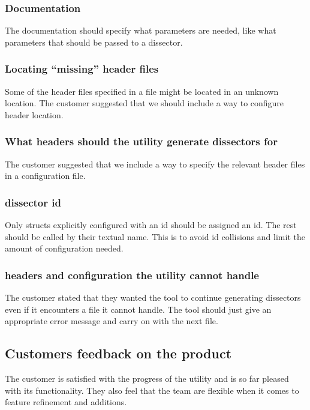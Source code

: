 \subsubsection{Documentation}
The documentation should specify what parameters are needed, like what parameters that should be passed to a \gls{dissector}.

\subsubsection{Locating “missing” \gls{header} files}
Some of the \gls{header} files specified in a file might be located in an unknown location. The customer suggested that we should include a way to configure \gls{header} location.

\subsubsection{What \glspl{header} should the \gls{utility} generate \glspl{dissector} for}
The customer suggested that we include a way to specify the relevant \gls{header} files in a configuration file.

\subsubsection{\Gls{dissector} id}
Only \glspl{struct} explicitly configured with an id should be assigned an id. The rest should be called by their textual name. This is to avoid id collisions and limit the amount of configuration needed.

\subsubsection{\Glspl{header} and configuration the \gls{utility} cannot handle}
The customer stated that they wanted the tool to continue generating \glspl{dissector} even if it encounters a file it cannot handle. The tool should just give an appropriate error message and carry on with the next file.

\subsection{Customers feedback on the product}
The customer is satisfied with the progress of the \gls{utility} and is so far pleased with its functionality. They also feel that the team are flexible when it comes to feature refinement and additions. 

